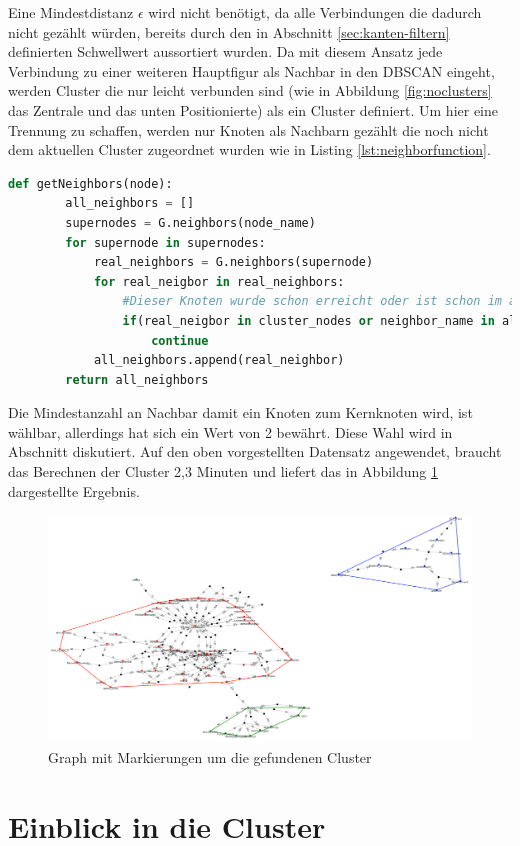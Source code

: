 Eine Mindestdistanz $\epsilon$ wird nicht benötigt, da alle Verbindungen die dadurch nicht gezählt würden, bereits durch den in Abschnitt \ref{sec:kanten-filtern} definierten Schwellwert aussortiert wurden.
Da mit diesem Ansatz jede Verbindung zu einer weiteren Hauptfigur als Nachbar in den DBSCAN eingeht, werden \gls{Cluster} die nur leicht verbunden sind (wie in Abbildung \ref{fig:noclusters} das Zentrale und das unten Positionierte) als ein \gls{Cluster} definiert. 
Um hier eine Trennung zu schaffen, werden nur Knoten als Nachbarn gezählt die noch nicht dem aktuellen \gls{Cluster} zugeordnet wurden wie in Listing \ref{lst:neighborfunction}.
\begin{lstlisting}[language=Python,caption={Abwandlung der DBSCAN Nachbarfunktion},label={lst:neighborfunction}]
	def getNeighbors(node):
		all_neighbors = []
		supernodes = G.neighbors(node_name)
		for supernode in supernodes:
			real_neighbors = G.neighbors(supernode)
			for real_neigbor in real_neighbors:
				#Dieser Knoten wurde schon erreicht oder ist schon im aktuellen Cluster
				if(real_neigbor in cluster_nodes or neighbor_name in all_neighbors):
					continue
			all_neighbors.append(real_neighbor)
		return all_neighbors
\end{lstlisting}
Die Mindestanzahl an Nachbar damit ein Knoten zum Kernknoten wird, ist wählbar, allerdings hat sich ein Wert von 2 bewährt. Diese Wahl wird in Abschnitt diskutiert.
Auf den oben vorgestellten Datensatz angewendet, braucht das Berechnen der \gls{Cluster} 2,3 Minuten und liefert das in Abbildung \ref{fig:clustersscreenshot} dargestellte Ergebnis.
\begin{figure}[h!]
	\centering
	\includegraphics[width=\linewidth]{images/Clusters_screenshot}
	\caption[]{Graph mit Markierungen um die gefundenen \gls{Cluster}}
	\label{fig:clustersscreenshot}
\end{figure}

\section{Einblick in die Cluster}











